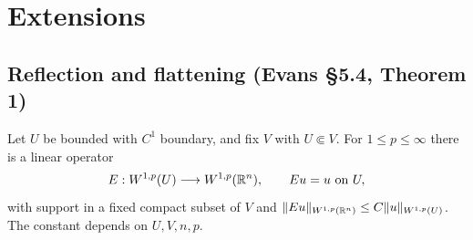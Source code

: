 \section{Extensions}
\label{sec:5-4}

\subsection{Reflection and flattening (Evans \S5.4, Theorem 1)}
\begin{theorem}[Extension]\label{thm:5-extension}
Let $U$ be bounded with $C^1$ boundary, and fix $V$ with $U\Subset V$.
For $1\leq p\leq\infty$ there is a linear operator
\[
 E:W^{1,p}(U)\longrightarrow W^{1,p}(\mathbb{R}^n),\qquad Eu=u\text{ on }U,
\]
with support in a fixed compact subset of $V$ and
$\|Eu\|_{W^{1,p}(\mathbb{R}^n)}\leq C\|u\|_{W^{1,p}(U)}$.
The constant depends on $U,V,n,p$.
\end{theorem}
\Needspace{45mm}
